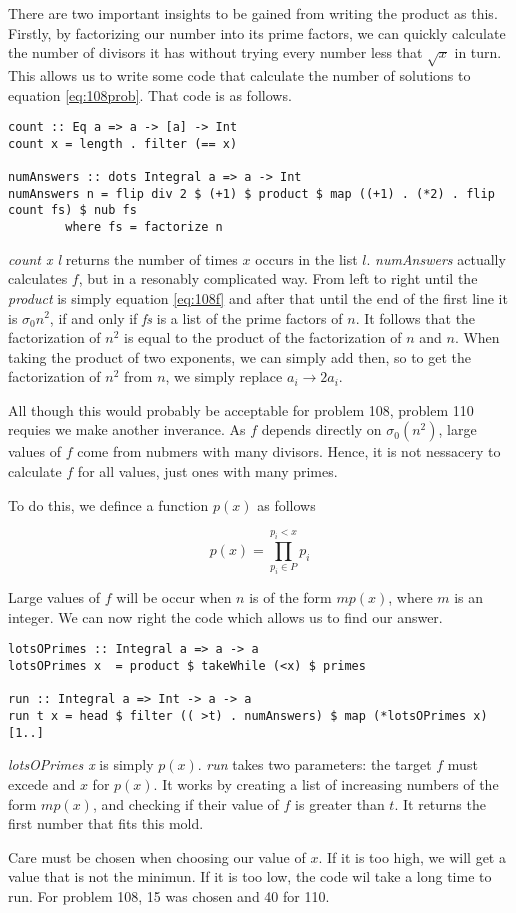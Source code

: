 There are two important insights to be gained from writing the product as this. Firstly, by factorizing our number into its prime factors, we can quickly calculate the number of divisors it has without trying every number less that $\sqrt{x}$ in turn. This allows us to write some code that calculate the number of solutions to equation \ref{eq:108prob}. That code is as follows.

\begin{lstlisting}
count :: Eq a => a -> [a] -> Int
count x = length . filter (== x)

numAnswers :: dots Integral a => a -> Int
numAnswers n = flip div 2 $ (+1) $ product $ map ((+1) . (*2) . flip count fs) $ nub fs
        where fs = factorize n

\end{lstlisting}

\textit{count x l} returns the number of times $x$ occurs in the list $l$. \textit{numAnswers} actually calculates $f$, but in a resonably complicated way. From left to right until the \textit{product} is simply equation \ref{eq:108f} and after that until the end of the first line it is $\sigma_0{n^2}$, if and only if \textit{fs} is a list of the prime factors of $n$. It follows that the factorization of $n^2$ is equal to the product of the factorization of $n$ and $n$. When taking the product of two exponents, we can simply add then, so to get the factorization of $n^2$ from $n$, we simply replace $a_i \to 2a_i$.

All though this would probably be acceptable for problem 108, problem 110 requies we make another inverance. As $f$ depends directly on $\sigma_0(n^2)$, large values of $f$ come from nubmers with many divisors. Hence, it is not nessacery to calculate $f$ for all values, just ones with many primes.

To do this, we defince a function $p(x)$ as follows

\begin{equation}
	p(x) = \prod _{p_i \in P} ^{p_i < x} p_i
\end{equation}

Large values of $f$ will be occur when $n$ is of the form $m p(x)$, where $m$ is an integer. We can now right the code which allows us to find our answer.

\begin{lstlisting}
lotsOPrimes :: Integral a => a -> a
lotsOPrimes x  = product $ takeWhile (<x) $ primes

run :: Integral a => Int -> a -> a
run t x = head $ filter (( >t) . numAnswers) $ map (*lotsOPrimes x) [1..]
\end{lstlisting}

\textit{lotsOPrimes x} is simply $p(x)$. \textit{run} takes two parameters: the target $f$ must excede and $x$ for $p(x)$.  It works by creating a list of increasing numbers of the form $m p(x)$, and checking if their value of $f$ is greater than $t$. It returns the first number that fits this mold.

Care must be chosen when choosing our value of $x$. If it is too high, we will get a value that is not the minimun. If it is too low, the code wil take a long time to run. For problem 108, 15 was chosen and 40 for 110.


